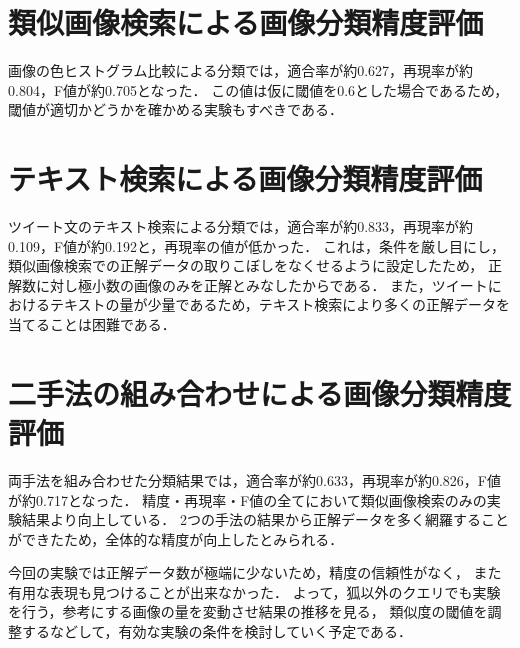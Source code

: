\section{類似画像検索による画像分類精度評価}
画像の色ヒストグラム比較による分類では，適合率が約0.627，再現率が約0.804，F値が約0.705となった．
この値は仮に閾値を0.6とした場合であるため，閾値が適切かどうかを確かめる実験もすべきである．

\section{テキスト検索による画像分類精度評価}
ツイート文のテキスト検索による分類では，適合率が約0.833，再現率が約0.109，F値が約0.192と，再現率の値が低かった．
これは，条件を厳し目にし，類似画像検索での正解データの取りこぼしをなくせるように設定したため，
正解数に対し極小数の画像のみを正解とみなしたからである．
また，ツイートにおけるテキストの量が少量であるため，テキスト検索により多くの正解データを当てることは困難である．

\section{二手法の組み合わせによる画像分類精度評価}
両手法を組み合わせた分類結果では，適合率が約0.633，再現率が約0.826，F値が約0.717となった．
精度・再現率・F値の全てにおいて類似画像検索のみの実験結果より向上している．
2つの手法の結果から正解データを多く網羅することができたため，全体的な精度が向上したとみられる．

今回の実験では正解データ数が極端に少ないため，精度の信頼性がなく，
また有用な表現も見つけることが出来なかった．
よって，狐以外のクエリでも実験を行う，参考にする画像の量を変動させ結果の推移を見る，
類似度の閾値を調整するなどして，有効な実験の条件を検討していく予定である．

